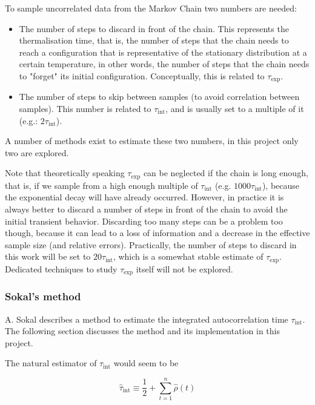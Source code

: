 To sample uncorrelated data from the Markov Chain two numbers are needed: 

\begin{itemize}
	\item The number of steps to discard in front of the chain. This represents the thermalisation time, that is, the number of steps that the chain needs to reach a configuration that is representative of the stationary distribution at a certain temperature, in other words, the number of steps that the chain needs to "forget" its initial configuration. Conceptually, this is related to $\tau_{\text{exp}}$.
	\item The number of steps to skip between samples (to avoid correlation between samples). This number is related to $\tau_{\text{int}}$, and is usually set to a multiple of it (e.g.: $2 \tau_{\text{int}}$).
\end{itemize}

A number of methods exist to estimate these two numbers, in this project only two are explored.

Note that theoretically speaking $\tau_{\text{exp}}$ can be neglected if the chain is long enough, that is, if we sample from a high enough multiple of $\tau_{\text{int}}$ (e.g. $1000 \tau_{\text{int}}$), because the exponential decay will have already occurred. However, in practice it is always better to discard a number of steps in front of the chain to avoid the initial transient behavior. Discarding too many steps can be a problem too though, because it can lead to a loss of information and a decrease in the effective sample size (and relative errors). Practically, the number of steps to discard in this work will be set to $20 \tau_{\text{int}}$, which is a somewhat stable estimate of $\tau_{\text{exp}}$. Dedicated techniques to study $\tau_{\text{exp}}$ itself will not be explored.

\br

\subsubsection{Sokal's method}

A. Sokal describes\cite{sokal} a method to estimate the integrated autocorrelation time $\tau_{\text{int}}$. The following section discusses the method and its implementation in this project.

The natural estimator of $\tau_{\text{int}}$ would seem to be

\begin{equation}
    \label{eq:tau_int}
    \widehat{\tau}_{\text{int}} \equiv \frac{1}{2} + \sum_{t=1}^{n} \widehat{\rho}(t)
\end{equation}

